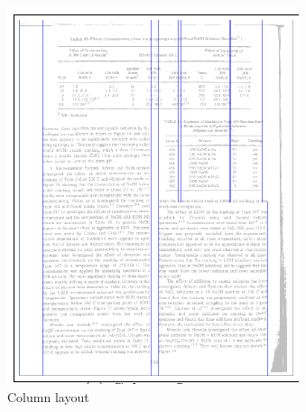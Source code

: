 \begin{figure}
\centering
\begin{subfigure}{0.30\textwidth}
\includegraphics[width=\linewidth]{img/tableDetection/tableDetectionColumns.pdf}
\caption{Column layout}
\label{fig:tessTableDet1}
\end{subfigure}
\quad
\begin{subfigure}{0.30\textwidth}

\end{subfigure}
\end{figure}
